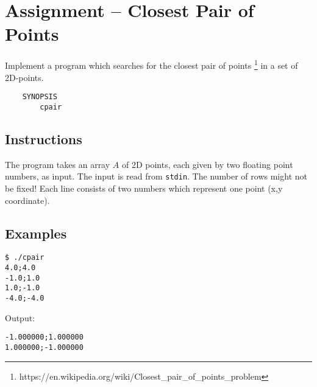 
\usepackage{amsmath}



\section*{ Assignment -- Closest Pair of Points}
Implement a program which searches for the closest pair of points \footnote{https://en.wikipedia.org/wiki/Closest\_pair\_of\_points\_problem} in a set of 2D-points.
\begin{verbatim}
    SYNOPSIS
        cpair
\end{verbatim}

\subsection*{Instructions}
The program takes an array $A$ of 2D points, each given by two floating point numbers, as input.
The input is read from \texttt{stdin}. The number of rows might not be fixed!
Each line consists of two numbers which represent one point (x,y coordinate).
\subsection*{Examples}
\begin{verbatim}
$ ./cpair
4.0;4.0
-1.0;1.0
1.0;-1.0
-4.0;-4.0
\end{verbatim}
Output: 
\begin{verbatim}
-1.000000;1.000000
1.000000;-1.000000
\end{verbatim}
